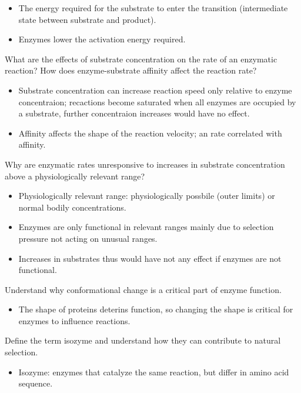 \documentclass[12pt,a4paper]{article}
\begin{document}
\begin{itemize}
\begin{itemize}
            \item The energy required for the substrate to enter the transition  (intermediate state between substrate and product).
            \item Enzymes lower the activation energy required.
        \end{itemize}
    {\color{G-Moon}\item What are the effects of substrate concentration on the rate of an enzymatic reaction? How does enzyme-substrate affinity affect the reaction rate?}
        \begin{itemize}
            \item Substrate concentration can increase reaction speed only relative to enzyme concentraion; recactions become saturated when all enzymes are occupied by a substrate, further concentraion increases would have no effect.
            \item Affinity affects the shape of the reaction velocity; an rate correlated with affinity.
        \end{itemize}
    {\color{G-Moon}\item Why are enzymatic rates unresponsive to increases in substrate concentration above a physiologically relevant range?}
        \begin{itemize}
            \item Physiologically relevant range: physiologically possbile (outer limits) or normal bodily concentrations.
            \item Enzymes are only functional in relevant ranges mainly due to selection pressure not acting on unusual ranges.
            \item Increases in substrates thus would have not any effect if enzymes are not functional.
        \end{itemize}
    {\color{G-Moon}\item Understand why conformational change is a critical part of enzyme function.}
        \begin{itemize}
            \item The shape of proteins deterins function, so changing the shape is critical for enzymes to influence reactions.
        \end{itemize}
    {\color{G-Moon}\item Define the term isozyme and understand how they can contribute to natural selection.}
        \begin{itemize}
            \item Isozyme: enzymes that catalyze the same reaction, but differ in amino acid sequence.

\end{itemize}
\end{itemize}
\end{document}
